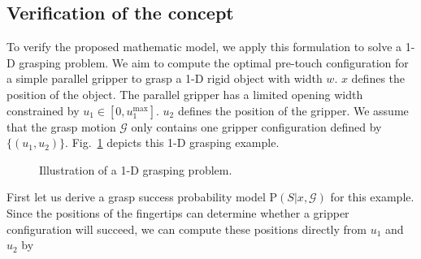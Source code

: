 \subsection{Verification of the concept}
To verify the proposed mathematic model, we apply this formulation to solve a 1-D grasping problem. We aim to compute the optimal pre-touch configuration for a simple parallel gripper to grasp a 1-D rigid  object with width $w$. $x$ defines the position of the object. The parallel gripper has a limited opening width constrained by $u_1 \in [0, u_{1}^{\text{max}}]$. $u_2$ defines the position of the gripper. We assume that the grasp motion $\mathcal{G}$ only contains one gripper configuration defined by $\{ (u_1,u_2) \}$. Fig.~\ref{fig:1D_simple} depicts this 1-D grasping example.

\begin{figure}[!htbp]
\centering
\def\svgwidth{0.8\linewidth}

\captionsetup{justification=raggedright}
\caption{Illustration of a 1-D grasping problem.}
\label{fig:1D_simple}
\end{figure}	

First let us  derive a grasp success probability model $\text{P}(S | x,  \mathcal{G} )$ for this example. Since the positions of the fingertips can determine whether a gripper configuration will succeed, we can compute these positions directly from $u_1$ and $u_2$ by   

